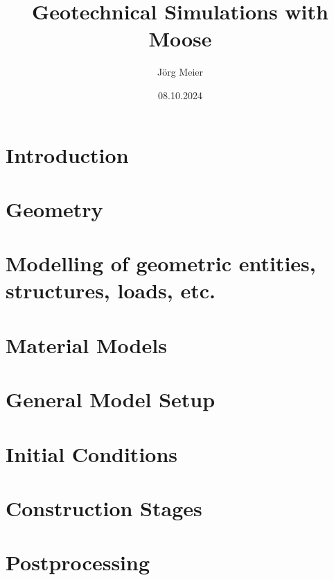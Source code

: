 \documentclass[12pt,a4paper]{report}
\title{Geotechnical Simulations with Moose}
\author{Jörg Meier}
\date{08.10.2024}
\begin{document}


\tableofcontents

\chapter{Introduction}
\label{chap:introduction}


\chapter{Geometry}
\label{chap:geometry}


\chapter{Modelling of geometric entities, structures, loads, etc.}
\label{chap:entities}


\chapter{Material Models}
\label{chap:materials}


\chapter{General Model Setup}
\label{chap:setup}


\chapter{Initial Conditions}
\label{chap:initial}


\chapter{Construction Stages}
\label{chap:stages}


\chapter{Postprocessing}
\label{chap:postprocessing}


% 
\end{document}

